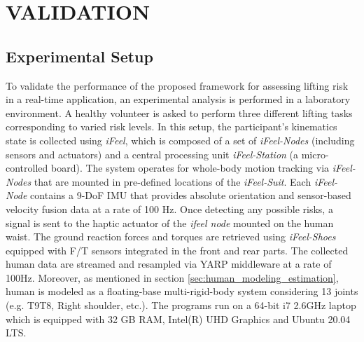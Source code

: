 
\section{VALIDATION}
\label{sec:validation}
\subsection{Experimental Setup}
To validate the performance of the proposed framework for assessing lifting risk in a real-time application, an experimental analysis is performed in a laboratory environment. A healthy volunteer is asked to perform three different lifting tasks corresponding to varied risk levels. In this setup, the participant’s kinematics state is collected using \emph{iFeel}, which is composed of a set of \emph{iFeel-Nodes} (including sensors and actuators) and a central processing unit \emph{iFeel-Station} (a micro-controlled board). The system operates for whole-body motion tracking via \emph{iFeel-Nodes} that are mounted in pre-defined locations of the \emph{iFeel-Suit}. Each \emph{iFeel-Node} contains a 9-DoF IMU that provides absolute orientation and sensor-based velocity fusion data at a rate of 100 Hz. Once detecting any possible risks, a signal is sent to the haptic actuator of the \emph{ifeel node} mounted on the human waist. The ground reaction forces and torques are retrieved using \emph{iFeel-Shoes} equipped with F/T sensors integrated in the front and rear parts. The collected human data are streamed and resampled via YARP middleware \cite{Metta2006} at a rate of 100Hz. Moreover, as mentioned in section \ref{sec:human_modeling_estimation}, human is modeled as a floating-base multi-rigid-body system considering 13 joints (e.g. T9T8, Right shoulder, etc.). The programs run on a 64-bit i7 2.6GHz laptop which is equipped with 32 GB RAM, Intel(R) UHD Graphics and Ubuntu 20.04 LTS. 

